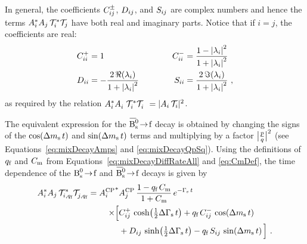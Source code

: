 In general, the coefficients $\Cf[ij]^\pm$, $\Df[ij]$, and $\Sf[ij]$ are complex numbers and hence the terms
$\Ai^*\Ai[j]\,\timeAmp^*\timeAmp[j]$ have both real and imaginary parts. Notice that if $i=j$, the coefficients are real:
\begin{equation}
  \begin{alignedat}{2}
    \Cf[ii]^+ &= 1                                                    &  \Cf[ii]^- &= \frac{1-\lamfSq[i]}{1+\lamfSq[i]} \\
    \Df[ii]   &= -\frac{2\,\Re(\lamf[i])}{1+\lamfSq[i]} \qquad\qquad  &  \Sf[ii]   &= \frac{2\,\Im(\lamf[i])}{1+\lamfSq[i]} \ ,
  \end{alignedat}
\end{equation}
as required by the relation $\Ai^*\Ai^{\phantom{*}}\,\timeAmp^*\timeAmp^{\phantom{*}} = |\Ai\,\timeAmp|^2$.

The equivalent expression for the $\Bsbartof$ decay is obtained by changing the signs of the $\cDms$ and $\sDms$ terms and multiplying
by a factor $\pqAbsAlt^\text{2}$ (see Equations~\ref{eq:mixDecayAmps} and \ref{eq:mixDecayQpSq}). Using the definitions of $\qf$ and
$\Cm$ from Equations~\ref{eq:mixDecayDiffRateAll} and \ref{eq:CmDef}, the time dependence of the $\Bstof$ and $\Bsbartof$ decays is
given by
\begin{equation}
  \label{eq:timeqfDep}
  \begin{aligned}
    \Ai^*\Ai[j]\,\timeAmp[i,\qf]^*\timeAmp[j,\qf]^{\phantom{*}} =
      \magAvConj&\magAv[{\Ai[j]}]\, \frac{1-\qf\,\Cm}{1+\Cm}\, \eGst \\
          \times\Big[ &\Cf[ij]^+\,\cDGs + \qf\,\Cf[ij]^-\,\cDms \\
                      &+ \Df[ij]\,\sDGs - \qf\,\Sf[ij]\,\sDms \Big] \ .
  \end{aligned}
\end{equation}

